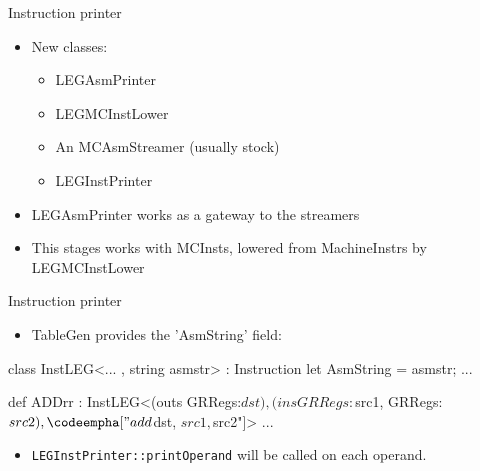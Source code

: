 
\begin{frame}{Instruction printer}

\begin{itemize}
    \item New classes:
    \begin{itemize}
        \item LEGAsmPrinter
        \item LEGMCInstLower
        \item An MCAsmStreamer (usually stock)
        \item LEGInstPrinter
    \end{itemize}
    \item LEGAsmPrinter works as a gateway to the streamers
    \item This stages works with MCInsts, lowered from MachineInstrs by LEGMCInstLower
\end{itemize}

\end{frame}


\begin{frame}[fragile]{Instruction printer}

\begin{itemize}
    \item TableGen provides the 'AsmString' field:
\end{itemize}

\begin{codebox}
class InstLEG<... , string asmstr> : Instruction {
  let AsmString = asmstr;
  ...
}
\end{codebox}

\begin{codebox}[commandchars=\\\[\]]
def ADDrr : InstLEG<(outs GRRegs:$dst),
                    (ins GRRegs:$src1, GRRegs:$src2),
                    \codeempha["add $dst, $src1, $src2"]> {
  ...
}
\end{codebox}

\begin{itemize}
    \item \texttt{LEGInstPrinter::printOperand} will be called on each operand.
\end{itemize}

\end{frame}

